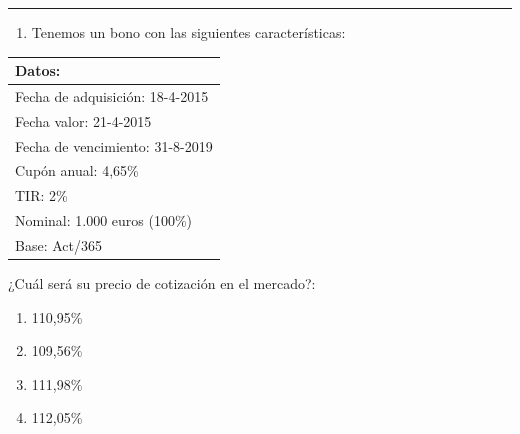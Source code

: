 \documentclass[
  letterpaper,
  DIV=11,
  numbers=noendperiod]{scrreprt}
\providecommand{\tightlist}{%
  \setlength{\itemsep}{0pt}\setlength{\parskip}{0pt}}\usepackage{longtable,booktabs,array}
\begin{document}
\begin{center}\rule{0.5\linewidth}{0.5pt}\end{center}

\begin{enumerate}
\def\labelenumi{\arabic{enumi}.}
\setcounter{enumi}{32}
\tightlist
\item
  Tenemos un bono con las siguientes características:
\end{enumerate}

\begin{longtable}[]{@{}l@{}}
\toprule()
\textbf{Datos:} \\
\midrule()
\endhead
Fecha de adquisición: 18-4-2015 \\
Fecha valor: 21-4-2015 \\
Fecha de vencimiento: 31-8-2019 \\
Cupón anual: 4,65\% \\
TIR: 2\% \\
Nominal: 1.000 euros (100\%) \\
Base: Act/365 \\
\bottomrule()
\end{longtable}

¿Cuál será su precio de cotización en el mercado?:

\begin{enumerate}
\def\labelenumi{\alph{enumi}.}
\item
  110,95\%
\item
  109,56\%
\item
  111,98\%
\item
  112,05\%
\end{enumerate}
\end{document}
